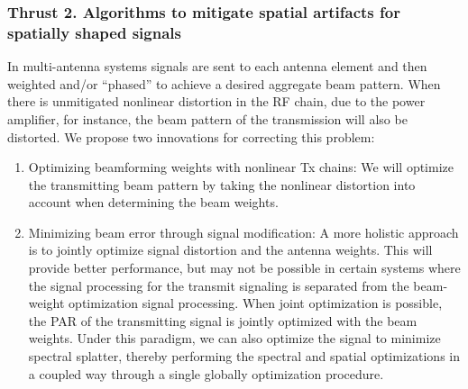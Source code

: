 \subsubsection{Thrust 2.  Algorithms to mitigate spatial artifacts for spatially shaped signals}
In multi-antenna systems signals are sent to each antenna element and then weighted and/or “phased” to achieve a desired aggregate beam pattern.  When there is unmitigated nonlinear distortion in the RF chain, due to the power amplifier, for instance, the beam pattern of the transmission will also be distorted.  We propose two innovations for correcting this problem:
\renewcommand{\theenumi}{\roman{enumi}}%
\begin{enumerate}
\item Optimizing beamforming weights with nonlinear Tx chains: We will optimize the transmitting beam pattern by taking the nonlinear distortion into account when determining the beam weights.  
\item Minimizing beam error through signal modification: A more holistic approach is to jointly optimize signal distortion and the antenna weights.  This will provide better performance, but may not be possible in certain systems where the signal processing for the transmit signaling is separated from the beam-weight optimization signal processing.  When joint optimization is possible, the PAR of the transmitting signal is jointly optimized with the beam weights.  Under this paradigm, we can also optimize the signal to minimize spectral splatter, thereby performing the spectral and spatial optimizations in a coupled way through a single globally optimization procedure.
\end{enumerate}

